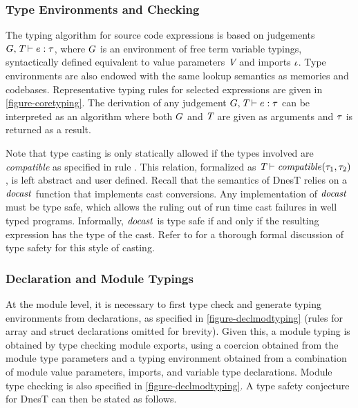 \subsubsection{Type Environments and Checking}

The typing algorithm for source code expressions is based on judgements $G,\textit{T} \vdash e
: \tau$, where $G$ is an environment of free term variable typings, syntactically defined
equivalent to value parameters $\textit{V}$ and imports $\iota$. Type environments are also
endowed with the same lookup semantics as memories and codebases. Representative typing rules
for selected expressions are given in \autoref{figure-coretyping}. The derivation of any
judgement $G,\textit{T} \vdash e : \tau$ can be interpreted as an algorithm where both $G$
and $\textit{T}$ are given as arguments and $\tau$ is returned as a result.

\coretypingfig

Note that type casting is only statically allowed if the types involved are \emph{compatible} as
specified in rule . This relation, formalized as $\textit{T} \vdash
\mathit{compatible}(\tau_1,\tau_2)$, is left abstract and user defined. Recall that the semantics of DnesT
relies on a $\mathit{docast}$ function that implements cast conversions. Any implementation of
$\mathit{docast}$ must be type safe, which allows the ruling out of run time cast failures in
well typed programs. Informally, $\mathit{docast}$ is type safe if and only if the resulting
expression has the type of the cast. Refer to \cite{FramedML} for a thorough formal discussion
of type safety for this style of casting.

\subsubsection{Declaration and Module Typings}

At the module level, it is necessary to first type check and generate typing environments from
declarations, as specified in \autoref{figure-declmodtyping} (rules for array and struct
declarations omitted for brevity). Given this, a module typing is obtained by type checking
module exports, using a coercion obtained from the module type parameters and a typing
environment obtained from a combination of module value parameters, imports, and variable type
declarations. Module type checking is also specified in \autoref{figure-declmodtyping}. A type
safety conjecture for DnesT can then be stated as follows.

